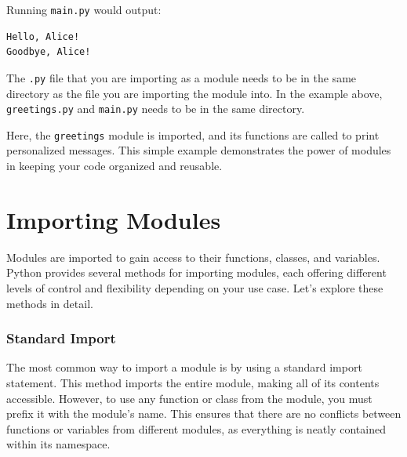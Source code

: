 \documentclass[
  letterpaper,
  DIV=11,
  numbers=noendperiod]{scrreprt}
\begin{document}
Running \texttt{main.py} would output:

\begin{verbatim}
Hello, Alice!
Goodbye, Alice!
\end{verbatim}

\begin{tcolorbox}[enhanced jigsaw, coltitle=black, colback=white, bottomrule=.15mm, arc=.35mm, titlerule=0mm, opacitybacktitle=0.6, toptitle=1mm, left=2mm, toprule=.15mm, opacityback=0, bottomtitle=1mm, title=\textcolor{quarto-callout-note-color}{\faInfo}\hspace{0.5em}{Note}, rightrule=.15mm, colframe=quarto-callout-note-color-frame, breakable, colbacktitle=quarto-callout-note-color!10!white, leftrule=.75mm]

The \texttt{.py} file that you are importing as a module needs to be in
the same directory as the file you are importing the module into. In the
example above, \texttt{greetings.py} and \texttt{main.py} needs to be in
the same directory.

\end{tcolorbox}

Here, the \texttt{greetings} module is imported, and its functions are
called to print personalized messages. This simple example demonstrates
the power of modules in keeping your code organized and reusable.

\hypertarget{importing-modules}{%
\section{Importing Modules}\label{importing-modules}}

Modules are imported to gain access to their functions, classes, and
variables. Python provides several methods for importing modules, each
offering different levels of control and flexibility depending on your
use case. Let's explore these methods in detail.

\hypertarget{standard-import}{%
\subsubsection{Standard Import}\label{standard-import}}

The most common way to import a module is by using a standard import
statement. This method imports the entire module, making all of its
contents accessible. However, to use any function or class from the
module, you must prefix it with the module's name. This ensures that
there are no conflicts between functions or variables from different
modules, as everything is neatly contained within its namespace.
\end{document}
